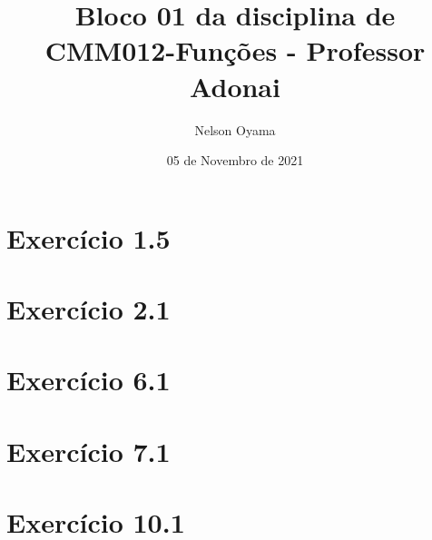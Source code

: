 \documentclass[a4paper]{article}
\author{Nelson Oyama}
\title{Bloco 01 da disciplina de CMM012-Funções - Professor Adonai}
\date{05 de Novembro de 2021}
\begin{document}
	\maketitle
	\section{Exercício 1.5}
	
	
	\newpage	
	\section{Exercício 2.1}
	
	
	\section{Exercício 6.1}
	
	
	\newpage
	\section{Exercício 7.1}
	
	
	\section{Exercício 10.1}
	
\end{document}
